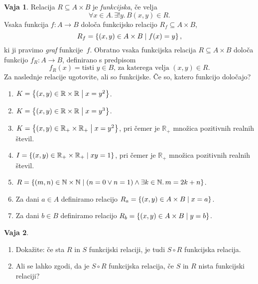 \documentclass{article}
\newcommand{\all}[1]{\forall #1 .\,}
\newcommand{\some}[1]{\exists #1 .\,}
\newcommand{\exactlyone}[1]{\exists{!} #1 .\,}
\newcommand{\NN}{\mathbb{N}}
\newcommand{\RR}{\mathbb{R}}
\theoremstyle{definition}
\newtheorem{vaja}{Vaja}
\begin{document}
\begin{vaja}
  Relacija $R \subseteq A \times B$ je \emph{funkcijska}, če velja
  \begin{equation*}
    \all{x \in A}{\exactlyone{y}{B}{(x,y) \in R}}.
  \end{equation*}
  Vsaka funkcija $f\colon A \to B$ določa funkcijsko relacijo $R_f
  \subseteq A \times B$,
  \begin{equation*}
    R_f = \set{(x,y) \in A \times B}{f(x) = y},
  \end{equation*}
  ki ji pravimo \emph{graf} funkcije~$f$. Obratno vsaka funkcijska
  relacija $R \subseteq A \times B$ določa funkcijo $f_R\colon A \to B$,
  definirano s predpisom
  \begin{equation*}
    f_R(x) = \text{tisti $y \in B$, za katerega velja $(x,y) \in R$}.
  \end{equation*}
  Za naslednje relacije ugotovite, ali so funkcijske. Če so, katero
  funkcijo določajo?
  \begin{enumerate}
    \item
      $K = \set{(x,y) \in \RR \times \RR}{x = y^2}$.
    \item
      $K = \set{(x,y) \in \RR \times \RR}{x = y^3}$.
    \item
      $K = \set{(x,y) \in \RR_{+} \times \RR_{+}}{x = y^2}$, pri čemer je $\RR_{+}$ množica pozitivnih realnih števil.
    \item
      $I = \set{(x,y) \in \RR_{+} \times \RR_{+}}{x y = 1}$, pri čemer je $\RR_{+}$ množica pozitivnih realnih števil.
    \item
      $R = \set{(m,n) \in \NN \times \NN}{(n = 0 \lor n = 1) \land \some{k \in \NN}{m = 2 k + n}}$.
    \item
      Za dani $a \in A$ definiramo relacijo $R_a = \set{(x,y) \in A \times B}{x = a}$.
    \item
      Za dani $b \in B$ definiramo relacijo $R_b = \set{(x,y) \in A \times B}{y = b}$.
  \end{enumerate}
\end{vaja}

\begin{vaja}
  \
  \begin{enumerate}
    \item
      Dokažite: če sta $R$ in $S$ funkcijski relaciji, je tudi $S \circ R$ funkcijska relacija.
    \item
      Ali se lahko zgodi, da je $S \circ R$ funkcijska relacija, če $S$ in $R$ nista funkcijski relaciji?  
  \end{enumerate}
\end{vaja}
\end{document}
